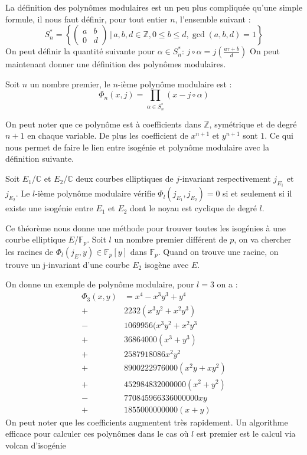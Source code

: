 \documentclass[12pt]{article}
\begin{document}
La définition des polynômes modulaires est un peu plus compliquée qu'une simple formule, il nous faut définir, pour tout entier $n$, l'ensemble suivant : 
\begin{equation*}
S_n^* = \left\{ \begin{pmatrix}
a & b\\
0 & d
\end{pmatrix}
\, | \, a,b,d \in \mathbb{Z}, 0 \leq b \leq d, \gcd(a,b,d) = 1
 \right\} 
\end{equation*}
On peut définir la quantité suivante pour $\alpha \in S_n^* $:  $j \circ \alpha = j(\frac{a\tau +b}{d})$
On peut maintenant donner une définition des polynômes modulaires.

\begin{defi}
Soit $n$ un nombre premier, le $n$-ième polynôme modulaire est :
\begin{equation*}
\Phi_n(x,j) = \prod_{\alpha \in S_n^*} (x - j \circ \alpha)
\end{equation*}
\end{defi}
On peut noter que ce polynôme est à coefficients dans $\mathbb{Z}$, symétrique et de degré $n+1$ en chaque variable. De plus les coefficient de $x^{n+1}$ et $y^{n+1}$ sont $1$.
Ce qui nous permet de faire le lien entre isogénie et polynôme modulaire avec la définition suivante.
\begin{defi}
Soit $E_1$/$\mathbb{C}$ et $E_2$/$\mathbb{C}$ deux courbes elliptiques de $j$-invariant respectivement $j_{E_1}$ et $j_{E_2}$. Le $l$-ième polynôme modulaire vérifie $\Phi_l(j_{E_1},j_{E_2}) = 0$ si et seulement si il existe une isogénie entre $E_1$ et $E_2$ dont le noyau est cyclique de degré $l$.
\end{defi}

Ce théorème nous donne une méthode pour trouver toutes les isogénies à une courbe elliptique $E$/$\mathbb{F}_p$. Soit $l$ un nombre premier différent de $p$, on va chercher les racines de $\Phi_l(j_E, y) \in \mathbb{F}_p[y]$ dans $\mathbb{F}_p$. Quand on trouve une racine, on trouve un j-invariant d'une courbe $E_2$ isogène avec $E$. 

On donne un exemple de polynôme modulaire, pour $ l =3$ on a :
\begin{align*}
\Phi_3(x,y) &= x^4 -x^3y^3 + y^4 \\
 +& 2232(x^3y^2 + x^2y^3) \\
 -& 1069956(x^3y^2 + x^2y^3 \\
 +& 36864000(x^3 + y^3) \\
 +& 2587918086x^2y^2 \\
 +& 8900222976000(x^2y + xy^2) \\
 +& 452984832000000(x^2 + y^2) \\
 -& 770845966336000000xy \\
 +& 1855000000000(x+y) 
\end{align*}
On peut noter que les coefficients augmentent très rapidement. Un algorithme efficace pour calculer ces polynômes dans le cas où $l$ est premier est le calcul via volcan d'isogénie \cite{volcan}
\end{document}
